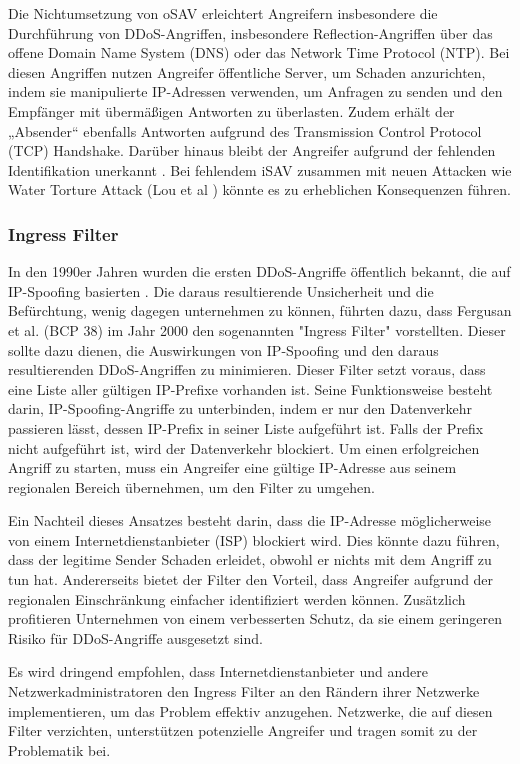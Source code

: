 \documentclass[sigplan,screen]{acmart}
\begin{document}
Die Nichtumsetzung von oSAV erleichtert Angreifern insbesondere die Durchführung von DDoS-Angriffen, insbesondere Reflection-Angriffen über das offene Domain Name System (DNS) oder das Network Time Protocol (NTP). Bei diesen Angriffen nutzen Angreifer öffentliche Server, um Schaden anzurichten, indem sie manipulierte IP-Adressen verwenden, um Anfragen zu senden und den Empfänger mit übermäßigen Antworten zu überlasten. Zudem erhält der „Absender“ ebenfalls Antworten aufgrund des Transmission Control Protocol (TCP) Handshake. Darüber hinaus bleibt der Angreifer aufgrund der fehlenden Identifikation unerkannt \cite{manrs01} \cite{Hal01} \cite{Ingress01}. Bei fehlendem iSAV zusammen mit neuen Attacken wie Water Torture Attack (Lou et al \cite{Lou01}) könnte es zu erheblichen Konsequenzen führen.

\subsubsection{Ingress Filter}
In den 1990er Jahren wurden die ersten DDoS-Angriffe öffentlich bekannt, die auf IP-Spoofing basierten \cite{CRP01}. Die daraus resultierende Unsicherheit und die Befürchtung, wenig dagegen unternehmen zu können, führten dazu, dass Fergusan et al. (BCP 38) \cite{Ingress01} im Jahr 2000 den sogenannten "Ingress Filter" vorstellten. Dieser sollte dazu dienen, die Auswirkungen von IP-Spoofing und den daraus resultierenden DDoS-Angriffen zu minimieren. Dieser Filter setzt voraus, dass eine Liste aller gültigen IP-Prefixe vorhanden ist. Seine Funktionsweise besteht darin, IP-Spoofing-Angriffe zu unterbinden, indem er nur den Datenverkehr passieren lässt, dessen IP-Prefix in seiner Liste aufgeführt ist. Falls der Prefix nicht aufgeführt ist, wird der Datenverkehr blockiert. Um einen erfolgreichen Angriff zu starten, muss ein Angreifer eine gültige IP-Adresse aus seinem regionalen Bereich übernehmen, um den Filter zu umgehen.

Ein Nachteil dieses Ansatzes besteht darin, dass die IP-Adresse möglicherweise von einem Internetdienstanbieter (ISP) blockiert wird. Dies könnte dazu führen, dass der legitime Sender Schaden erleidet, obwohl er nichts mit dem Angriff zu tun hat. Andererseits bietet der Filter den Vorteil, dass Angreifer aufgrund der regionalen Einschränkung einfacher identifiziert werden können. Zusätzlich profitieren Unternehmen von einem verbesserten Schutz, da sie einem geringeren Risiko für DDoS-Angriffe ausgesetzt sind.

Es wird dringend empfohlen, dass Internetdienstanbieter und andere Netzwerkadministratoren den Ingress Filter an den Rändern ihrer Netzwerke implementieren, um das Problem effektiv anzugehen. Netzwerke, die auf diesen Filter verzichten, unterstützen potenzielle Angreifer und tragen somit zu der Problematik bei.
\end{document}
